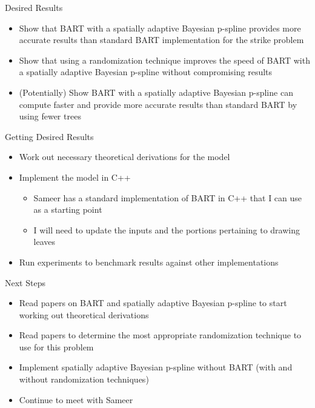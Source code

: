 \documentclass{beamer}
\begin{document}
\begin{frame}{Desired Results}
    \begin{itemize}
        \item Show that BART with a spatially adaptive Bayesian p-spline provides more accurate results than standard BART implementation for the strike problem
        \item Show that using a randomization technique improves the speed of BART with a spatially adaptive Bayesian p-spline without compromising results
        \item (Potentially) Show BART with a spatially adaptive Bayesian p-spline can compute faster and provide more accurate results than standard BART by using fewer trees
    \end{itemize} 
\end{frame}

\begin{frame}{Getting Desired Results}
    \begin{itemize}
        \item Work out necessary theoretical derivations for the model
        \item Implement the model in C++
        \begin{itemize}
            \item Sameer has a standard implementation of BART in C++ that I can use as a starting point
            \item I will need to update the inputs and the portions pertaining to drawing leaves
        \end{itemize}
        \item Run experiments to benchmark results against other implementations
    \end{itemize} 
\end{frame}

\begin{frame}{Next Steps}
    \begin{itemize}
        \item Read papers on BART and spatially adaptive Bayesian p-spline to start working out theoretical derivations
        \item Read papers to determine the most appropriate randomization technique to use for this problem
        \item Implement spatially adaptive Bayesian p-spline without BART (with and without randomization techniques)
        \item Continue to meet with Sameer
    \end{itemize} 
\end{frame}
\end{document}
